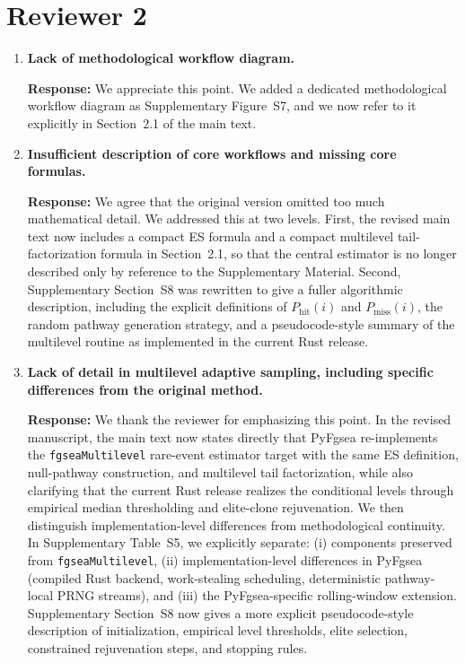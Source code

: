 \documentclass[11pt]{article}
\begin{document}
\section*{Reviewer 2}

\begin{enumerate}[leftmargin=1.5em]
\item \textbf{Lack of methodological workflow diagram.}

\textbf{Response:} We appreciate this point. We added a dedicated methodological workflow diagram as Supplementary Figure~S7, and we now refer to it explicitly in Section~2.1 of the main text.

\item \textbf{Insufficient description of core workflows and missing core formulas.}

\textbf{Response:} We agree that the original version omitted too much mathematical detail. We addressed this at two levels. First, the revised main text now includes a compact ES formula and a compact multilevel tail-factorization formula in Section~2.1, so that the central estimator is no longer described only by reference to the Supplementary Material. Second, Supplementary Section~S8 was rewritten to give a fuller algorithmic description, including the explicit definitions of $P_{\mathrm{hit}}(i)$ and $P_{\mathrm{miss}}(i)$, the random pathway generation strategy, and a pseudocode-style summary of the multilevel routine as implemented in the current Rust release.

\item \textbf{Lack of detail in multilevel adaptive sampling, including specific differences from the original method.}

\textbf{Response:} We thank the reviewer for emphasizing this point. In the revised manuscript, the main text now states directly that PyFgsea re-implements the \texttt{fgseaMultilevel} rare-event estimator target with the same ES definition, null-pathway construction, and multilevel tail factorization, while also clarifying that the current Rust release realizes the conditional levels through empirical median thresholding and elite-clone rejuvenation. We then distinguish implementation-level differences from methodological continuity. In Supplementary Table~S5, we explicitly separate: (i) components preserved from \texttt{fgseaMultilevel}, (ii) implementation-level differences in PyFgsea (compiled Rust backend, work-stealing scheduling, deterministic pathway-local PRNG streams), and (iii) the PyFgsea-specific rolling-window extension. Supplementary Section~S8 now gives a more explicit pseudocode-style description of initialization, empirical level thresholds, elite selection, constrained rejuvenation steps, and stopping rules.


\end{enumerate}
\end{document}
